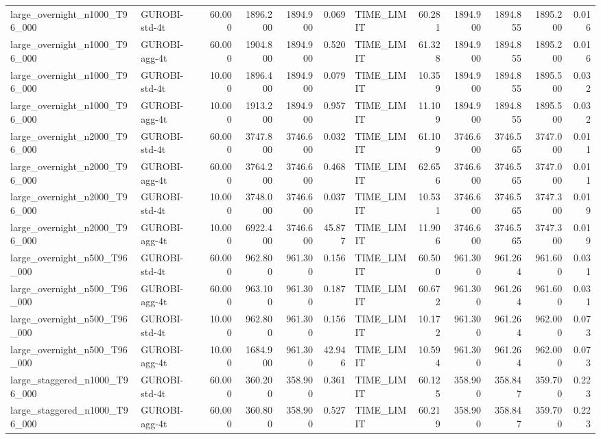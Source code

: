\begin{table}[htbp]
\begin{tabular}{llrrrrlrrrrr}
large\_overnight\_n1000\_T96\_000 & GUROBI-std-4t & 60.000 & 1896.200 & 1894.900 & 0.069 & TIME\_LIMIT & 60.281 & 1894.900 & 1894.855 & 1895.200 & 0.016 \\
large\_overnight\_n1000\_T96\_000 & GUROBI-agg-4t & 60.000 & 1904.800 & 1894.900 & 0.520 & TIME\_LIMIT & 61.328 & 1894.900 & 1894.855 & 1895.200 & 0.016 \\
large\_overnight\_n1000\_T96\_000 & GUROBI-std-4t & 10.000 & 1896.400 & 1894.900 & 0.079 & TIME\_LIMIT & 10.359 & 1894.900 & 1894.855 & 1895.500 & 0.032 \\
large\_overnight\_n1000\_T96\_000 & GUROBI-agg-4t & 10.000 & 1913.200 & 1894.900 & 0.957 & TIME\_LIMIT & 11.109 & 1894.900 & 1894.855 & 1895.500 & 0.032 \\
large\_overnight\_n2000\_T96\_000 & GUROBI-std-4t & 60.000 & 3747.800 & 3746.600 & 0.032 & TIME\_LIMIT & 61.109 & 3746.600 & 3746.565 & 3747.000 & 0.011 \\
large\_overnight\_n2000\_T96\_000 & GUROBI-agg-4t & 60.000 & 3764.200 & 3746.600 & 0.468 & TIME\_LIMIT & 62.656 & 3746.600 & 3746.565 & 3747.000 & 0.011 \\
large\_overnight\_n2000\_T96\_000 & GUROBI-std-4t & 10.000 & 3748.000 & 3746.600 & 0.037 & TIME\_LIMIT & 10.531 & 3746.600 & 3746.565 & 3747.300 & 0.019 \\
large\_overnight\_n2000\_T96\_000 & GUROBI-agg-4t & 10.000 & 6922.400 & 3746.600 & 45.877 & TIME\_LIMIT & 11.906 & 3746.600 & 3746.565 & 3747.300 & 0.019 \\
large\_overnight\_n500\_T96\_000 & GUROBI-std-4t & 60.000 & 962.800 & 961.300 & 0.156 & TIME\_LIMIT & 60.500 & 961.300 & 961.264 & 961.600 & 0.031 \\
large\_overnight\_n500\_T96\_000 & GUROBI-agg-4t & 60.000 & 963.100 & 961.300 & 0.187 & TIME\_LIMIT & 60.672 & 961.300 & 961.264 & 961.600 & 0.031 \\
large\_overnight\_n500\_T96\_000 & GUROBI-std-4t & 10.000 & 962.800 & 961.300 & 0.156 & TIME\_LIMIT & 10.172 & 961.300 & 961.264 & 962.000 & 0.073 \\
large\_overnight\_n500\_T96\_000 & GUROBI-agg-4t & 10.000 & 1684.900 & 961.300 & 42.946 & TIME\_LIMIT & 10.594 & 961.300 & 961.264 & 962.000 & 0.073 \\
large\_staggered\_n1000\_T96\_000 & GUROBI-std-4t & 60.000 & 360.200 & 358.900 & 0.361 & TIME\_LIMIT & 60.125 & 358.900 & 358.847 & 359.700 & 0.223 \\
large\_staggered\_n1000\_T96\_000 & GUROBI-agg-4t & 60.000 & 360.800 & 358.900 & 0.527 & TIME\_LIMIT & 60.219 & 358.900 & 358.847 & 359.700 & 0.223 \\

\end{tabular}
\end{table}
